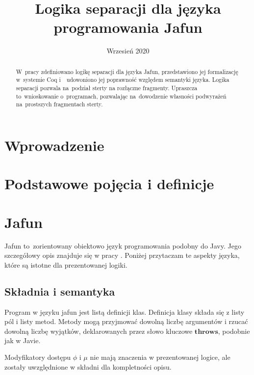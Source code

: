 \documentclass[]{pracamgr}
\title{Logika separacji dla języka programowania Jafun}
\date{Wrzesień 2020}
\renewcommand \| {\hspace{0.75em} | \hspace{0.75em} }
\renewcommand \[ {[\![}
\renewcommand \] {]\!]}
\theoremstyle{definition}
\newcommand{\mmod}{\mu\xspace}
\newcommand{\fmodifier}{\phi\xspace}
\newcommand{\throws}{\mathbf{throws}\xspace}
\begin{document}
\maketitle

\begin{abstract}
  W~pracy zdefiniowano logikę separacji dla języka Jafun, przedstawiono jej formalizację
  w~systemie Coq i~~udowoniono jej poprawność względem semantyki języka. Logika separacji pozwala
  na~podział sterty na rozłączne fragmenty. Upraszcza to~wnioskowanie o~programach, pozwalając
  na~dowodzenie własności podwyrażeń na~prostszych fragmentach sterty.
\end{abstract}

\tableofcontents

\chapter*{Wprowadzenie}

\chapter{Podstawowe pojęcia i definicje}

\chapter{Jafun}

Jafun to~zorientowany obiektowo język programowania podobny do Javy.
Jego szczegółowy opis znajduje się w pracy \cite{jafun-def}.
Poniżej przytaczam te aspekty języka, które są istotne dla prezentowanej logiki.

\section{Składnia i semantyka}

Program w języku jafun jest listą definicji klas.
Definicja klasy składa się z listy pól i listy metod.
Metody mogą przyjmować dowolną liczbę argumentów i rzucać dowolną liczbę wyjątków,
deklarowanych przez słowo kluczowe $\throws$, podobnie jak w Javie.

Modyfikatory dostępu $\fmodifier$ i $\mmod$ nie mają znaczenia w prezentowanej logice, ale zostały uwzględnione
w składni dla kompletności opisu.
\end{document}
